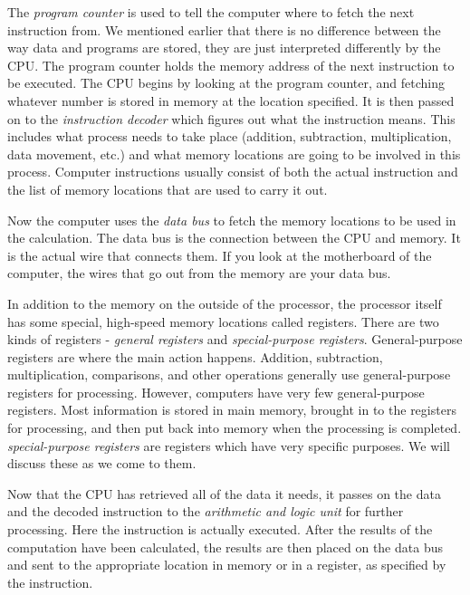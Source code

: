 The \emph{program counter} is used to tell the computer where
to fetch the next instruction from.  We mentioned earlier that there is no
difference between the way data and programs are stored, they are just 
interpreted differently by the CPU.  The program counter holds the 
memory address of the next instruction
to be executed.  The CPU begins by looking at the program counter, and fetching
whatever number is stored in memory at the location specified.  It is then
passed on to the \emph{instruction decoder} which figures
out what the instruction means.  This includes what process needs to take
place (addition, subtraction, multiplication, data movement, etc.) and 
what memory locations are going to be involved in this process.  Computer
instructions usually consist of both the actual instruction and the list
of memory locations that are used to carry it out.

Now the computer uses the \emph{data bus} to fetch the memory
locations to be used in the calculation.  The data bus is the connection
between the CPU and memory.  It is the actual wire that connects them.  If
you look at the motherboard of the computer, the wires that go out from the
memory are your data bus.

In addition to the memory on the outside of the processor, the processor
itself has some special, high-speed memory locations called registers.  
There are two kinds of registers - \emph{general registers} and 
\emph{special-purpose registers}.  
General-purpose registers are where the main action happens.  Addition, 
subtraction, multiplication, comparisons, and other operations generally
use general-purpose registers for processing.  However, computers have very
few general-purpose registers.  Most information is stored in main memory,
brought in to the registers for processing, and then put back into memory
when the processing is completed.
\emph{special-purpose registers} are registers which have very specific
purposes.  We will discuss these as we come to them.

Now that the CPU has retrieved all of the data it needs, it passes on
the data and the decoded instruction to the \emph{arithmetic and logic unit}
for further processing.  Here the instruction is actually executed.
After the results of the computation have been calculated, the results
are then placed on the data bus and sent to the appropriate location
in memory or in a register, as specified by the instruction.

